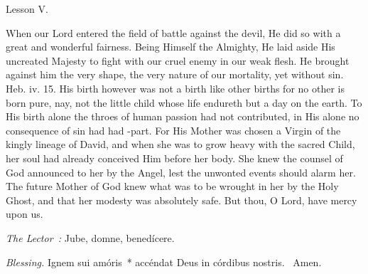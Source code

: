 {  \bigskip{}
  {
    \hfil{Lesson V.}\hfil

    \begin{parcolumns}[rulebetween,colwidths={1=.51\linewidth}]{2}
    {When our Lord entered the field of battle against the devil, He did so with a great and wonderful fairness. Being Himself the Almighty, He laid aside His uncreated Majesty to fight with our cruel enemy in our weak flesh. He brought against him the very shape, the very nature of our mortality, yet without sin. Heb. iv. 15. His birth however was not a birth like other births for no other is born pure, nay, not the little child whose life endureth but a day on the earth. To His birth alone the throes of human passion had not contributed, in His alone no consequence of sin had had -part. For His Mother was chosen a Virgin of the kingly lineage of David, and when she was to grow heavy with the sacred Child, her soul had already conceived Him before her body. She knew the counsel of God announced to her by the Angel, lest the unwonted events should alarm her. The future Mother of God knew what was to be wrought in her by the Holy Ghost, and that her modesty was absolutely safe.
      But thou, O Lord, have mercy upon us.}
    \end{parcolumns}

  }

  {
    \medskip

    \emph{The Lector~:} Jube, domne, benedícere.

    \emph{Blessing.} Ignem sui amóris~* accéndat Deus in córdibus nostris. \Rbar{}~Amen.
  }

}
